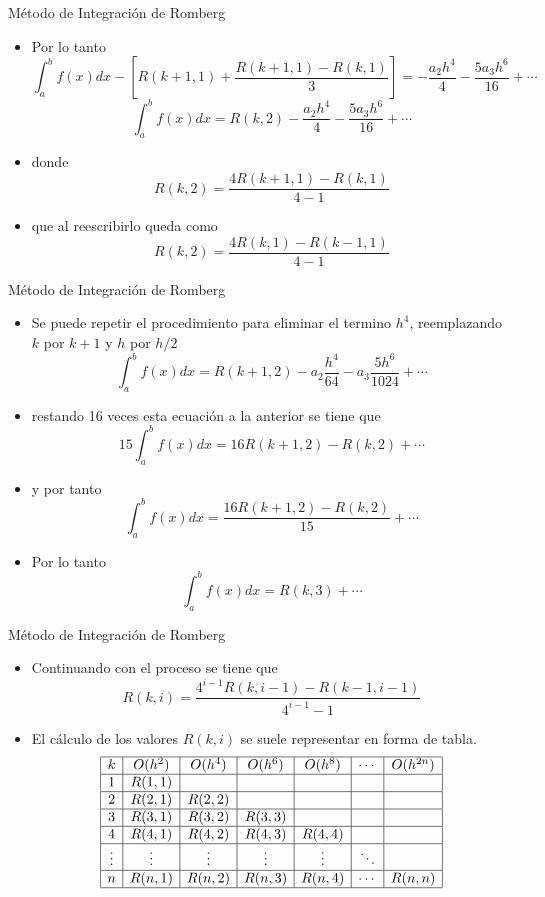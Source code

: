 \documentclass[12pt]{beamer}
\begin{document}
\begin{frame}{M\'etodo de Integraci\'on de Romberg}
  \begin{itemize} 
    \item Por lo tanto
    {\small
    $$
    \int_{a}^{b}f(x)dx-\left[R(k+1,1)+\dfrac{R(k+1,1)-R(k,1)}{3}\right] =-\dfrac{a_2h^4}{4} - \dfrac{5a_3h^6}{16}+\cdots
    $$}
    $$
    \int_{a}^{b}f(x)dx =R(k,2) -\dfrac{a_2h^4}{4} - \dfrac{5a_3h^6}{16}+\cdots
    $$
    \item donde 
    $$
    R(k,2) = \dfrac{4R(k+1,1)-R(k,1)}{4-1}
    $$
    \item que al reescribirlo queda como
    $$
    R(k,2) = \dfrac{4R(k,1)-R(k-1,1)}{4-1}
    $$
  \end{itemize}
\end{frame}
\begin{frame}{M\'etodo de Integraci\'on de Romberg}
  \begin{itemize}
    \item Se puede repetir el procedimiento para eliminar el termino $h^4$, reemplazando $k$ por $k+1$ y $h$ por $h/2$
    $$
    \int_{a}^{b}f(x)dx =R(k+1,2)-a_2\dfrac{h^4}{64} - a_3\dfrac{5h^6}{1024}+\cdots    
    $$
    \item restando 16 veces esta ecuaci\'on a la anterior se tiene que
    $$
    15\int_{a}^{b}f(x)dx =16R(k+1,2)-R(k,2)+\cdots
    $$
    \item y por tanto
    $$
    \int_{a}^{b}f(x)dx = \dfrac{16R(k+1,2)-R(k,2)}{15}+\cdots
    $$
    \item Por lo tanto
    $$
    \int_{a}^{b}f(x)dx = R(k,3) + \cdots
    $$
  \end{itemize}
\end{frame}
\begin{frame}{M\'etodo de Integraci\'on de Romberg}
  \begin{itemize}
    \item Continuando con el proceso se tiene que
    $$
    R(k,i) = \dfrac{4^{i-1}R(k,i-1)-R(k-1,i-1)}{4^{i-1}-1}
    $$
    \item El c\'alculo de los valores $R(k,i)$ se suele representar en forma de tabla.
    $$
    \begin{array}{|c|c|c|c|c|c|c|}
    \hline
    k      & O(h^2)  & O(h^4)  & O(h^6)  & O(h^8)  & \cdots & O(h^{2n})\\ \hline                             
    1      & R(1,1) &        &        &        &        &       \\\hline
    2      & R(2,1) & R(2,2) &        &        &        &       \\\hline
    3      & R(3,1) & R(3,2) & R(3,3) &        &        &       \\\hline
    4      & R(4,1) & R(4,2) & R(4,3) & R(4,4) &        &       \\\hline
    \vdots & \vdots & \vdots & \vdots & \vdots & \ddots &       \\\hline
    n      & R(n,1) & R(n,2) & R(n,3) & R(n,4) & \cdots & R(n,n)\\\hline
    \end{array} 
    $$    
  \end{itemize}
\end{frame}
\end{document}
